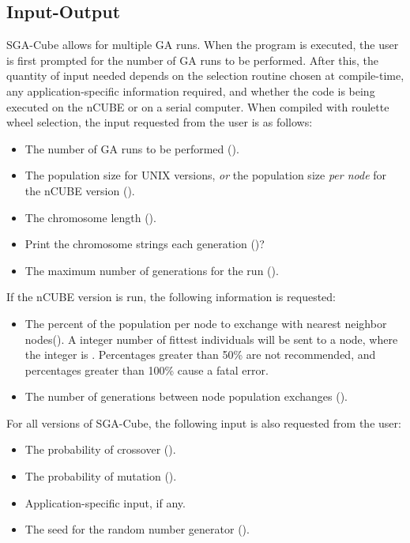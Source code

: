 \subsection{Input-Output}
SGA-Cube allows for multiple GA runs.
When the program is executed, the user is first prompted
for the number of GA runs to be
performed.  After this, the quantity of input needed depends on 
the selection routine chosen at compile-time, any
application-specific information required, and whether the
code is being executed on the nCUBE or on a serial computer.  
When compiled
with roulette wheel selection, 
the input requested from the user is as follows:
\begin{itemize}
\item The number of GA runs to be performed ({}).
\item The population size for UNIX versions, {\em or} the population size 
{\em per node} for the nCUBE version ({}).
\item The chromosome length ({}).
\item Print the chromosome strings each generation ({})?
\item The maximum number of generations for the run ({}).
\end{itemize}
If the nCUBE version is run, the following information is requested:
\begin{itemize}
\item The percent of the population per node to exchange with nearest neighbor
nodes({}).  A integer number of fittest individuals will be sent to a
node, where the integer is {}.
Percentages greater than 50\% are not recommended, and percentages greater than
100\% cause a fatal error.
\item The number of generations between node population exchanges ({}).
\end{itemize}
For all versions of SGA-Cube, the following input is also requested from the user:
\begin{itemize}
\item The probability of crossover ({}).
\item The probability of mutation ({}).
\item Application-specific input, if any.
\item The seed for the random number generator ({}).
\end{itemize}

